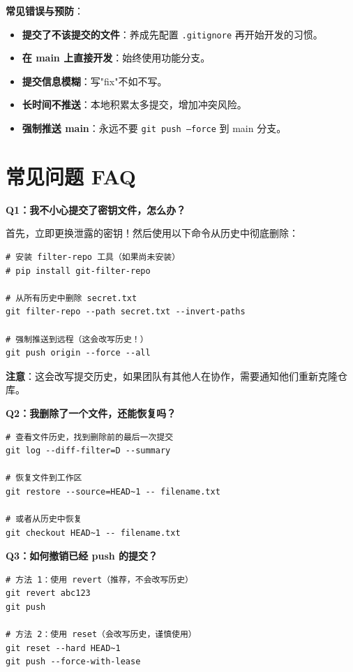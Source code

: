 \documentclass[12pt,a4paper,openany]{ctexbook}
\begin{document}
\begin{warnbox}
\textbf{常见错误与预防}：
\begin{itemize}
  \item \textbf{提交了不该提交的文件}：养成先配置 \texttt{.gitignore} 再开始开发的习惯。
  \item \textbf{在 main 上直接开发}：始终使用功能分支。
  \item \textbf{提交信息模糊}：写"fix"不如不写。
  \item \textbf{长时间不推送}：本地积累太多提交，增加冲突风险。
  \item \textbf{强制推送 main}：永远不要 \texttt{git push --force} 到 main 分支。
\end{itemize}
\end{warnbox}

\section{常见问题 FAQ}

\begin{infobox}
\textbf{Q1：我不小心提交了密钥文件，怎么办？}

首先，立即更换泄露的密钥！然后使用以下命令从历史中彻底删除：

\begin{lstlisting}[style=shellinbox]
# 安装 filter-repo 工具（如果尚未安装）
# pip install git-filter-repo

# 从所有历史中删除 secret.txt
git filter-repo --path secret.txt --invert-paths

# 强制推送到远程（这会改写历史！）
git push origin --force --all
\end{lstlisting}

\textbf{注意}：这会改写提交历史，如果团队有其他人在协作，需要通知他们重新克隆仓库。
\end{infobox}

\begin{infobox}
\textbf{Q2：我删除了一个文件，还能恢复吗？}

\begin{lstlisting}[style=shellinbox]
# 查看文件历史，找到删除前的最后一次提交
git log --diff-filter=D --summary

# 恢复文件到工作区
git restore --source=HEAD~1 -- filename.txt

# 或者从历史中恢复
git checkout HEAD~1 -- filename.txt
\end{lstlisting}
\end{infobox}

\begin{infobox}
\textbf{Q3：如何撤销已经 push 的提交？}

\begin{lstlisting}[style=shellinbox]
# 方法 1：使用 revert（推荐，不会改写历史）
git revert abc123
git push

# 方法 2：使用 reset（会改写历史，谨慎使用）
git reset --hard HEAD~1
git push --force-with-lease
\end{lstlisting}
\end{infobox}
\end{document}
